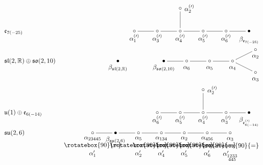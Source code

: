 \documentclass[pdftex]{sigma}
\numberwithin{equation}{section}
\newcommand{\BR}{\mathbb{R}}
\begin{document}
\renewcommand{\textfraction}{0.01}
\renewcommand{\topfraction}{0.99}

\begin{figure}[t!]
\begin{align*}
&\mathfrak{e}_{7(-25)} &\xygraph{ \circ ([]!{+(0,-.3)} {\alpha_1^{(\prime)}}) - [r]
\circ ([]!{+(0,-.3)} {\alpha_3^{(\prime)}}) - [r]
\circ ([]!{+(0,-.3)} {\alpha_4^{(\prime)}}) (
- [u] \circ ([]!{+(.4,0)} {\alpha_2^{(\prime)}}),
- [r] \circ ([]!{+(0,-.3)} {\alpha_5^{(\prime)}})
- [r] \circ ([]!{+(0,-.3)} {\alpha_6^{(\prime)}})
- [r] \bullet ([]!{+(0,-.4)} {\beta_{\mathfrak{e}_{7(-25)}}}))}\\[-1mm]
&\mathfrak{sl}(2,\BR)\oplus\mathfrak{so}(2,10) &\xygraph{ \bullet ([]!{+(0,-.3)} {\beta_{\mathfrak{sl}(2,\BR)}}) [r] [r]
\bullet ([]!{+(0,-.3)} {\beta_{\mathfrak{so}(2,10)}}) - [r]
\circ ([]!{+(0,-.3)} {\alpha_6}) - [r]
\circ ([]!{+(0,-.3)} {\alpha_5}) - [r]
\circ ([]!{+(0,-.3)} {\alpha_4}) (
- []!{+(1,.5)} \circ ([]!{+(0,-.3)} {\alpha_2}),
- []!{+(1,-.5)} \circ ([]!{+(0,-.3)} {\alpha_3}))}\\[-1mm]
&\mathfrak{u}(1)\oplus\mathfrak{e}_{6(-14)} &\xygraph{ \circ ([]!{+(0,-.3)} {\alpha_6^{(\prime)}}) - [r]
\circ ([]!{+(0,-.3)} {\alpha_5^{(\prime)}}) - [r]
\circ ([]!{+(0,-.3)} {\alpha_4^{(\prime)}}) (
- [u] \circ ([]!{+(.4,0)} {\alpha_2^{(\prime)}}),
- [r] \circ ([]!{+(0,-.3)} {\alpha_3^{(\prime)}})
- [r] \bullet ([]!{+(0,-.4)} {\beta_{\mathfrak{e}_{6(-14)}^{(\prime)}}}))}\\[-1mm]
&\mathfrak{su}(2,6) &\xygraph{ \circ ([]!{+(0,-.6)} {\shortstack{$\alpha_{23445}$\\$\rotatebox{90}{=}$\\$\alpha_1'$}}) - [r]
\bullet ([]!{+(0,-.3)} {\beta_{\mathfrak{su}(2,6)}}) - [r]
\circ ([]!{+(0,-.6)} {\shortstack{$\alpha_5$\\$\rotatebox{90}{=}$\\$\alpha_2'$}}) - [r]
\circ ([]!{+(0,-.6)} {\shortstack{$\alpha_{134}$\\$\rotatebox{90}{=}$\\$\alpha_4'$}}) - [r]
\circ ([]!{+(0,-.6)} {\shortstack{$\alpha_2$\\$\rotatebox{90}{=}$\\$\alpha_5'$}}) - [r]
\circ ([]!{+(0,-.6)} {\shortstack{$\alpha_{456}$\\$\rotatebox{90}{=}$\\$\alpha_6'$}}) - [r]
\circ ([]!{+(0,-.7)} {\shortstack{$\alpha_3$\\$\rotatebox{90}{=}$\\$\alpha_{\substack{1233\\445}}'$}})} \\[-1mm]

\end{align*}
\end{figure}
\end{document}
